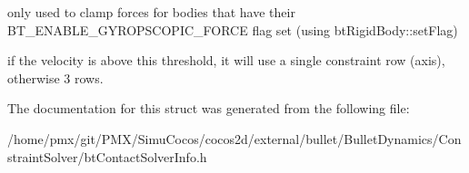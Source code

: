 only used to clamp forces for bodies that have their B\+T\+\_\+\+E\+N\+A\+B\+L\+E\+\_\+\+G\+Y\+R\+O\+P\+S\+C\+O\+P\+I\+C\+\_\+\+F\+O\+R\+CE flag set (using bt\+Rigid\+Body\+::set\+Flag)

if the velocity is above this threshold, it will use a single constraint row (axis), otherwise 3 rows. 

The documentation for this struct was generated from the following file\+:\begin{DoxyCompactItemize}
\item 
/home/pmx/git/\+P\+M\+X/\+Simu\+Cocos/cocos2d/external/bullet/\+Bullet\+Dynamics/\+Constraint\+Solver/bt\+Contact\+Solver\+Info.\+h\end{DoxyCompactItemize}
